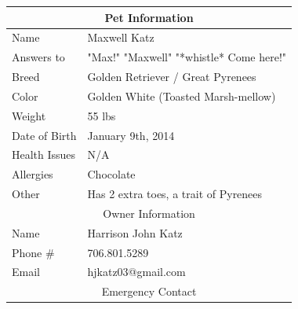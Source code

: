 \documentclass[pdftex,12pt]{article}
\begin{document}
\begin{table}[H]
    \begin{longtable}{@{}ll@{}}
        \toprule
        \multicolumn{2}{c}{Pet Information}                                                                              \\ \midrule
        Name          & Maxwell Katz                                                                                     \\
        Answers to    & "Max!" "Maxwell" "*whistle* Come here!"                                                          \\
        Breed         & Golden Retriever / Great Pyrenees                                                                \\
        Color         & Golden White (Toasted Marsh-mellow)                                                              \\
        Weight        & 55 lbs                                                                                           \\
        Date of Birth & January 9th, 2014                                                                                \\
        Health Issues & N/A                                                                                              \\
        Allergies     & Chocolate                                                                                        \\
        Other         & Has 2 extra toes, a trait of Pyrenees                                                            \\ \midrule
        \multicolumn{2}{c}{Owner Information}                                                                            \\ \midrule
        Name          & Harrison John Katz                                                                               \\
        Phone \#      & 706.801.5289                                                                                     \\
        Email         & hjkatz03@gmail.com                                                                               \\ \midrule
        \multicolumn{2}{c}{Emergency Contact}                                                                            \\ \midrule

\end{longtable}
\end{table}
\end{document}
